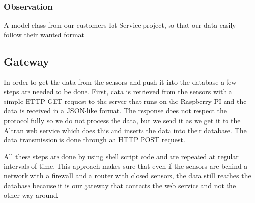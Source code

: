 \documentclass[../document]{subfiles}
\begin{document}
\subsubsection{Observation}
A model class from our customers Iot-Service project, so that our data easily follow their wanted format.

\subsection{Gateway}
In order to get the data from the sensors and push it into the database a few steps are needed to be done. First, data is retrieved from the sensors with a simple HTTP GET request to the server that runs on the Raspberry PI and the data is received in a JSON-like format. The response does not respect the protocol fully so we do not process the data, but we send it as we get it to the Altran web service which does this and inserts the data into their database. The data transmission is done through an HTTP POST request. 

All these steps are done by using shell script code and are repeated at regular intervals of time.
This approach makes sure that even if the sensors are behind a network with a firewall and a router with closed sensors, the data still reaches the database because it is our gateway that contacts the web service and not the other way around.
\end{document}
